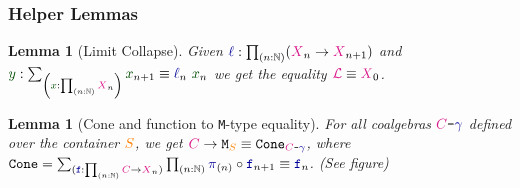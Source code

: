 \documentclass[xelatex,mathserif,serif,notheorems]{beamer} %
\theoremstyle{plain} %
\newtheorem{lem}[thm]{Lemma}
\theoremstyle{definition}
\theoremstyle{remark}
\newcommand*{\term}[1]{\textcolor{green!30!black}{#1}} %
\newcommand*{\type}[1]{\textcolor{magenta!90!black}{#1}}
\newcommand*{\container}[1]{\textcolor{orange}{#1}}
\newcommand*{\coalg}[2]{#1\texttt{-}#2}
\newcommand*{\function}[1]{\textcolor{blue!60!black}{\ensuremath{\mathtt{#1}}}}
\newcommand*{\typeformer}[1]{\ensuremath{\mathtt{#1}}}
\newcommand{\setlengths}{
  \setlength{\abovedisplayskip}{4pt}
  \setlength{\belowdisplayskip}{4pt}
  \setlength{\abovedisplayshortskip}{2pt}
  \setlength{\belowdisplayshortskip}{2pt}
}
\begin{document}
\begin{frame}[fragile]
  \frametitle{Helper Lemmas}
  \begin{lem}[Limit Collapse]\setlengths
    \label{lem:limit-collapse}
    Given \(\function{\ell} : \prod_{(n : \mathbb{N})} (\type{X}_{n} \rightarrow \type{X}_{n+1})\) and \(\term{y} : \sum_{\left(\term{x} : \prod_{(n : \mathbb{N})} \type{X}_n\right)} \term{x}_{n + 1} \equiv \function{\ell}_n~\term{x}_n\) we get the equality \(\type{\mathcal{L}} \equiv \type{X}_0\).
  \end{lem}
  \begin{lem}[Cone and function to \texttt{M}-type equality]\setlengths
    \label{lem:function-to-M-type-is-cone}
    For all coalgebras \(\coalg{\type{C}}{\function{\gamma}}\) defined over the container \(\container{S}\), we get \(\type{C} \rightarrow \typeformer{M}_{\container{S}} \equiv \typeformer{Cone}_{\coalg{\type{C}}{\function{\gamma}}}\), where \(\typeformer{Cone} = \sum_{(\function{f} : \prod_{(n : \mathbb{N})} \type{C} \rightarrow \type{X}_n)} \prod_{(n : \mathbb{N})} \function{\pi}_{(n)} \circ \function{f}_{n+1} \equiv \function{f}_n\). (See figure)
  \end{lem}
  \begin{figure}[h]
    \centering
  \end{figure}
\end{frame}
\end{document}
